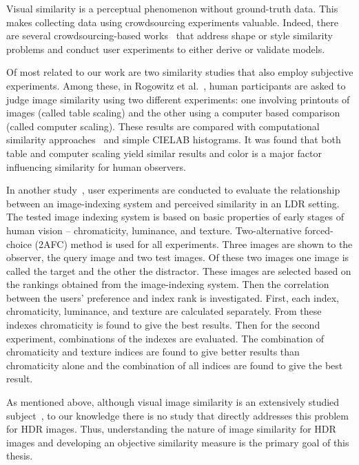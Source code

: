 Visual similarity is a perceptual phenomenon without ground-truth data. This makes collecting data using crowdsourcing experiments valuable. Indeed, there are several crowdsourcing-based works~\cite{lun2015elements,saleh2015learning,kleiman2016toward} that address shape or style similarity problems and conduct user experiments to either derive or validate models. 

Of most related to our work are two similarity studies that also employ subjective experiments. Among these, in Rogowitz et al.~\cite{rogowitz1998perceptual}, human participants are asked to judge image similarity using two different experiments: one involving printouts of images (called table scaling) and the other using a computer based comparison (called computer scaling). These results are compared with computational similarity approaches~\cite{frese1997methodology} and simple CIELAB histograms. It was found that both table and computer scaling yield similar results and color is a major factor influencing similarity for human observers.

In another study~\cite{neumann2006image}, user experiments are conducted to evaluate the relationship between an image-indexing system and perceived similarity in an LDR setting. The tested image indexing system is based on basic properties of early stages of human vision -- chromaticity, luminance, and texture. Two-alternative forced-choice (2AFC) method is used for all experiments. Three images are shown to the observer, the query image and two test images. Of these two images one image is called the target and the other the distractor. These images are selected based on the rankings obtained from the image-indexing system. Then the correlation between the users' preference and index rank is investigated. First, each index, chromaticity, luminance, and texture are calculated separately. From these indexes chromaticity is found to give the best results. Then for the second experiment, combinations of the indexes are evaluated. The combination of chromaticity and texture indices are found to give better results than chromaticity alone and the combination of all indices are found to give the best result.

As mentioned above, although visual image similarity is an extensively studied subject~\cite{liu2007survey}, to our knowledge there is no study that directly addresses this problem for HDR images. Thus, understanding the nature of image similarity for HDR images and developing an objective similarity measure is the primary goal of this thesis. 